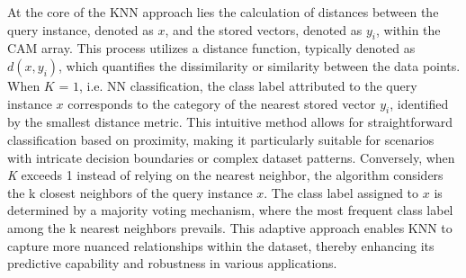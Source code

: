 At the core of the KNN approach lies the calculation of distances between the query instance, denoted as $x$, and the stored vectors, denoted as $y_i$, within the CAM array.
This process utilizes a distance function, typically denoted as $d(x, y_i)$, which quantifies the dissimilarity or similarity between the data points. 
When $\textit{K = }1$, i.e. NN classification, the class label attributed to the query instance $x$ corresponds to the category of the nearest stored vector $y_i$, identified by the smallest distance metric. This intuitive method allows for straightforward classification based on proximity, making it particularly suitable for scenarios with intricate decision boundaries or complex dataset patterns.
Conversely, when \textit{K} exceeds 1 instead of relying on the nearest neighbor, the algorithm considers the k closest neighbors of the query instance $x$. The class label assigned to $x$ is determined by a majority voting mechanism, where the most frequent class label among the k nearest neighbors prevails. 
This adaptive approach enables KNN to capture more nuanced relationships within the dataset, thereby enhancing its predictive capability and robustness in various applications.





